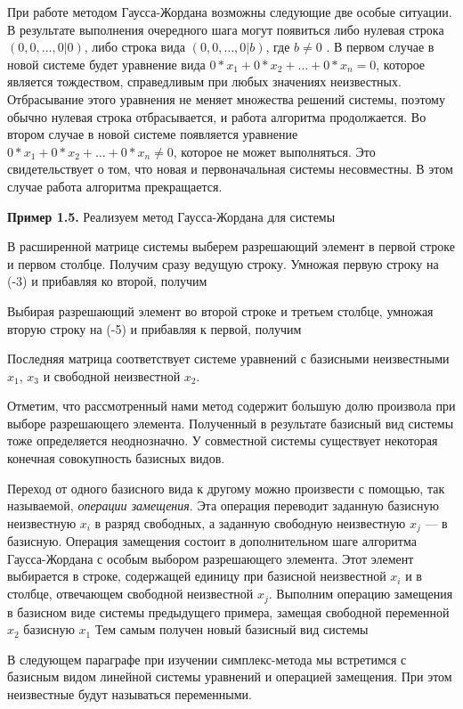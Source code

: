 \documentclass{article}
\begin{document}
При работе методом Гаусса-Жордана возможны следующие две особые ситуации. В результате выполнения очередного шага могут появиться либо нулевая строка
$(0, 0,\dots, 0|0)$, либо строка вида $(0, 0,\dots, 0|b)$, где $b \neq 0$ . В первом случае в новой системе будет уравнение вида $0*x_1 + 0*x_2 + \dots + 0*x_n=0$, которое является тождеством, справедливым при любых значениях неизвестных. Отбрасывание этого уравнения не меняет множества решений системы, поэтому обычно нулевая строка отбрасывается, и работа алгоритма продолжается. Во втором случае в новой системе появляется уравнение $0*x_1 + 0*x_2 + \dots + 0*x_n \neq 0$, которое не может выполняться. Это свидетельствует о том, что новая и первоначальная системы несовместны. В этом случае работа алгоритма прекращается.

\textbf{Пример 1.5.}  Реализуем метод Гаусса-Жордана для системы

В расширенной матрице системы выберем разрешающий элемент в первой строке и первом столбце. Получим сразу ведущую строку. Умножая первую строку на (-3) и прибавляя ко второй, получим

Выбирая разрешающий элемент во второй строке и третьем столбце, умножая вторую строку на (-5) и прибавляя к первой, получим

Последняя матрица соответствует системе уравнений
с базисными неизвестными $x_1$, $x_3$ и свободной неизвестной $x_2$.

Отметим, что рассмотренный нами метод содержит большую долю произвола при выборе разрешающего элемента. Полученный в результате базисный вид системы тоже определяется неоднозначно. У совместной системы существует некоторая конечная совокупность базисных видов.

Переход от одного базисного вида к другому можно произвести с помощью, так называемой, \textit{операции замещения}. Эта операция переводит заданную базисную неизвестную $x_i$ в разряд свободных, а заданную свободную неизвестную $x_j$ — в базисную. Операция замещения состоит в дополнительном шаге алгоритма Гаусса-Жордана с особым выбором разрешающего элемента. Этот элемент выбирается в строке, содержащей единицу при базисной неизвестной $x_i$ и в столбце, отвечающем свободной неизвестной $x_j$. Выполним операцию замещения в базисном виде системы предыдущего примера, замещая свободной переменной  $x_2$ базисную $x_1$
Тем самым получен новый базисный вид системы

В следующем параграфе при изучении симплекс-метода мы встретимся с базисным видом линейной системы уравнений и операцией замещения. При этом неизвестные будут называться переменными.
\end{document}
